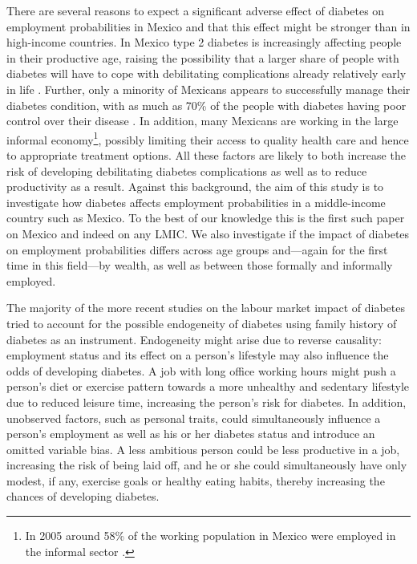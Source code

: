 There are several reasons to expect a significant adverse
effect of diabetes on employment probabilities in Mexico and that this effect
might be stronger than in high-income countries. In Mexico type 2
diabetes is increasingly affecting people in their productive age,
raising the possibility that a larger share of people with diabetes
will have to cope with debilitating complications already relatively
early in life \parencite{Barquera2013,Villalpando2010}. Further, only
a minority of Mexicans appears to successfully manage their diabetes
condition, with as much as 70\% of the people with diabetes
having poor control over their disease \parencite{Villalpando2010}. In
addition, many Mexicans are working in the large informal economy\footnote{In 2005 around 58\% of the working population in Mexico were
employed in the informal sector \parencite{Aguila2011}.}, possibly limiting their access to quality health care and hence
to appropriate treatment options. All these factors are likely to
both increase the risk of developing debilitating diabetes complications
as well as to reduce productivity as a result. Against this background,
the aim of this study is to investigate how diabetes affects employment
probabilities in a middle-income country such as Mexico. To the best
of our knowledge this is the first such paper on Mexico and indeed
on any \ac{LMIC}. We also investigate if the impact of diabetes on
employment probabilities differs across age groups and---again for the
first time in this field---by wealth, as well as between those formally
and informally employed.

The majority of the more recent studies on the labour market
impact of diabetes tried to account for the possible endogeneity of
diabetes using family history of diabetes as an instrument. Endogeneity
might arise due to reverse causality: employment status and its effect
on a person's lifestyle may also influence the odds of developing
diabetes. A job with long office working hours might push a person's
diet or exercise pattern towards a more unhealthy and sedentary lifestyle
due to reduced leisure time, increasing the person's risk for diabetes.
In addition, unobserved factors, such as personal traits, could simultaneously
influence a person's employment as well as his or her diabetes status
and introduce an omitted variable bias. A less ambitious person could
be less productive in a job, increasing the risk of being laid off,
and he or she could simultaneously have only modest, if any, exercise
goals or healthy eating habits, thereby increasing the chances of
developing diabetes.

